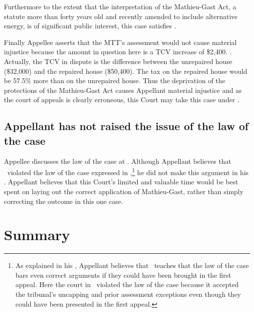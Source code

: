 \documentclass[12pt,\documentclassflag]{michiganCourtOfAppealsBrief}
\begin{document}
Furthermore to the extent that the interpretation of the Mathieu-Gast Act, a statute more than forty years old and recently amended to include alternative energy, is of significant public interest, this case satisfies \cite{MCR 7.305(B)(2)}.

Finally Appellee asserts that the MTT's assessment would not cause material injustice because the amount in question here is a TCV increase of \$2,400. . Actually, the TCV in dispute is the difference between the unrepaired house (\$32,000) and the repaired house (\$50,400). The tax on the repaired house would be 57.5\% more than on the unrepaired house. Thus the deprivation of the protections of the Mathieu-Gast Act causes Appellant material injustice and as the court of appeals is clearly erroneous, this Court may take this case under \cite{MCR 7.305(B)(5)(a)}.


\subsection{Appellant has not raised the issue of the law of the case}

Appellee discusses the law of the case at . Although Appellant believes that \cite{Patru II}\ violated the law of the case expressed in \cite{Patru I},\footnote{As explained in his , Appellant believes that \ teaches that the law of the case bars even correct arguments if they could have been brought in the first appeal. Here the court in \cite{Patru II}\ violated the law of the case because it accepted the tribunal's uncapping and prior assessment exceptions even though they could have been presented in the first appeal.} he did not make this argument in his \cite{Leave to Appeal}. Appellant believes that this Court's limited and valuable time would be best spent on laying out the correct application of Mathieu-Gast, rather than simply correcting the outcome in this one case.


\section{Summary}
\end{document}
